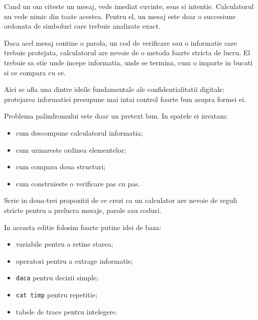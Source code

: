 
\begin{missionbox}
  Cand un om citeste un mesaj, vede imediat cuvinte, sens si intentie. Calculatorul nu vede nimic din toate acestea. Pentru el, un mesaj este doar o succesiune ordonata de simboluri care trebuie analizate exact.

  Daca acel mesaj contine o parola, un cod de verificare sau o informatie care trebuie protejata, calculatorul are nevoie de o metoda foarte stricta de lucru. El trebuie sa stie unde incepe informatia, unde se termina, cum o imparte in bucati si ce compara cu ce.

  Aici se afla una dintre ideile fundamentale ale confidentialitatii digitale: protejarea informatiei presupune mai intai control foarte bun asupra formei ei.
\end{missionbox}

\begin{conceptbox}
  Problema palindromului este doar un pretext bun. In spatele ei invatam:
  \begin{itemize}
    \item cum descompune calculatorul informatia;
    \item cum urmareste ordinea elementelor;
    \item cum compara doua structuri;
    \item cum construieste o verificare pas cu pas.
  \end{itemize}
\end{conceptbox}

\begin{guidebox}[Activare]
  Scrie in doua-trei propozitii de ce crezi ca un calculator are nevoie de reguli stricte pentru a prelucra mesaje, parole sau coduri.
\end{guidebox}

\newpage
{}

\begin{conceptbox}
  In aceasta editie folosim foarte putine idei de baza:
  \begin{itemize}
    \item variabile pentru a retine starea;
    \item operatori pentru a extrage informatie;
    \item \texttt{daca} pentru decizii simple;
    \item \texttt{cat timp} pentru repetitie;
    \item tabele de trace pentru intelegere.
  \end{itemize}
\end{conceptbox}

